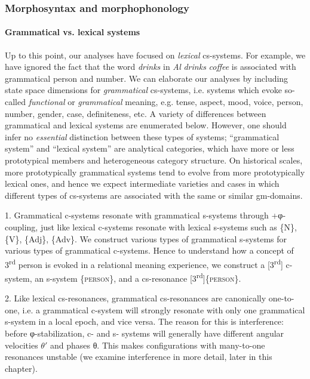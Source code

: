 \subsubsection{Morphosyntax and morphophonology}
\paragraph{Grammatical vs. lexical systems}

Up to this point, our analyses have focused on \textit{lexical} cs-systems. For example, we have ignored the fact that the word \textit{drinks} in \textit{Al} \textit{drinks} \textit{coffee} is associated with grammatical person and number. We can elaborate our analyses by including state space dimensions for \textit{grammatical} cs-systems, i.e. systems which evoke so-called \textit{functional} or \textit{grammatical} meaning, e.g. tense, aspect, mood, voice, person, number, gender, case, definiteness, etc. A variety of differences between grammatical and lexical systems are enumerated below. However, one should infer no \textit{essential} distinction between these types of systems; “grammatical system” and “lexical system” are analytical categories, which have more or less prototypical members and heterogeneous category structure. On historical scales, more prototypically grammatical systems tend to evolve from more prototypically lexical ones, and hence we expect intermediate varieties and cases in which different types of cs-systems are associated with the same or similar gm-domains. 

1. Grammatical c-systems resonate with grammatical s-systems through +φ-coupling, just like lexical c-systems resonate with lexical s-systems such as \{N\}, \{V\}, \{Adj\}, \{Adv\}. We construct various types of grammatical s-systems for various types of grammatical c-systems. Hence to understand how a concept of 3\textsuperscript{rd} person is evoked in a relational meaning experience, we construct a [3\textsuperscript{rd}] c-system, an s-system \{\textsc{person}\}, and a cs-resonance [3\textsuperscript{rd}]\{\textsc{person}\}. 

2. Like lexical cs-resonances, grammatical cs-resonances are canonically one-to-one, i.e. a grammatical c-system will strongly resonate with only one grammatical s-system in a local epoch, and vice versa. The reason for this is interference: before φ-stabilization, c- and s- systems will generally have different angular velocities $\theta ′$ and phases θ. This makes configurations with many-to-one resonances unstable (we examine interference in more detail, later in this chapter).

